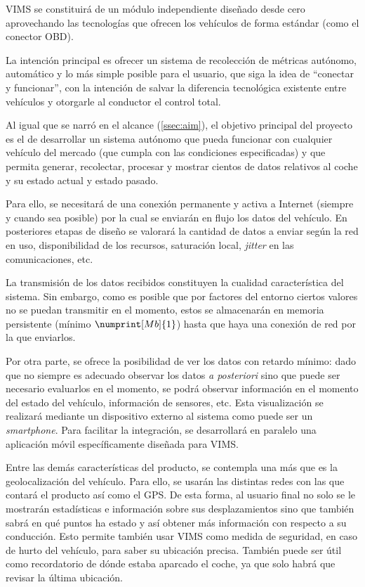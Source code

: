 \ac{VIMS} se constituirá de un módulo independiente diseñado desde cero aprovechando
las tecnologías que ofrecen los vehículos de forma estándar (como el conector
\ac{OBD}).

La intención principal es ofrecer un sistema de recolección de métricas autónomo,
automático y lo más simple posible para el usuario, que siga la idea de ``conectar y funcionar'',
con la intención de salvar la diferencia tecnológica existente entre vehículos
y otorgarle al conductor el control total.

Al igual que se narró en el alcance (\ref{ssec:aim}), el objetivo principal del proyecto es
el de desarrollar un sistema autónomo que pueda funcionar con cualquier vehículo
del mercado (que cumpla con las condiciones especificadas) y que permita generar,
recolectar, procesar y mostrar cientos de datos relativos al coche y su estado
actual y estado pasado.

Para ello, se necesitará de una conexión permanente y activa a Internet (siempre
y cuando sea posible) por la cual se enviarán en flujo los datos del vehículo.
En posteriores etapas de diseño se valorará la cantidad de datos a enviar según
la red en uso, disponibilidad de los recursos, saturación local, \textit{jitter}
en las comunicaciones, etc.

La transmisión de los datos recibidos constituyen la cualidad característica
del sistema. Sin embargo, como es posible que por factores del entorno ciertos
valores no se puedan transmitir en el momento, estos se almacenarán en memoria
persistente (mínimo $\numprint[Mb]{1}$) hasta que haya una conexión de red
por la que enviarlos.

Por otra parte, se ofrece la posibilidad de ver los datos con retardo mínimo: dado que
no siempre es adecuado observar los datos \textit{a posteriori} sino que puede ser necesario evaluarlos en el momento, se podrá observar información en
el momento del estado del vehículo, información de sensores, etc. Esta
visualización se realizará mediante un dispositivo externo al sistema como
puede ser un \textit{smartphone}. Para facilitar la integración, se desarrollará
en paralelo una aplicación móvil específicamente diseñada para \ac{VIMS}.

Entre las demás características del producto, se contempla una más que es la
geolocalización del vehículo. Para ello, se usarán las distintas redes con
las que contará el producto así como el \ac{GPS}. De esta forma,
al usuario final no solo se le mostrarán estadísticas e información sobre sus
desplazamientos sino que también sabrá en qué puntos ha estado y así obtener más
información con respecto a su conducción. Esto permite también usar \ac{VIMS} como
medida de seguridad, en caso de hurto del vehículo, para saber su ubicación
precisa. También puede ser útil como recordatorio de dónde estaba aparcado el
coche, ya que solo habrá que revisar la última ubicación.

